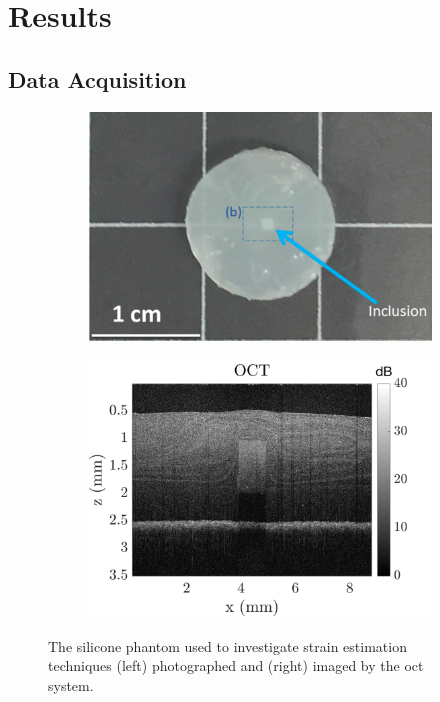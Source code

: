 \chapter{Results}\label{results}

\section{Data Acquisition}\label{data}

\begin{figure}
	\centering
	\begin{subfigure}{0.47\textwidth}
		\centering
		\includegraphics[width=\textwidth]{figures/phantom.png}
	\end{subfigure}
	\quad
	\begin{subfigure}{0.49\textwidth}
		\centering
		\includegraphics[width=\textwidth]{figures/oct.png}
	\end{subfigure}	
	\caption{The silicone phantom used to investigate strain estimation techniques (left) photographed and (right) imaged by the \ac{oct} system.}
	\label{oct_image}	
\end{figure}

